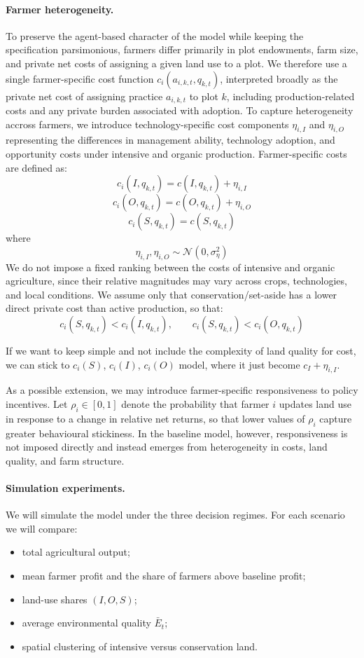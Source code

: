 \documentclass{article}
\begin{document}
\paragraph{Farmer heterogeneity.}
To preserve the agent-based character of the model while keeping the specification parsimonious, farmers differ primarily in plot endowments, farm size, and private net costs of assigning a given land use to a plot. We therefore use a single farmer-specific cost function $c_i(a_{i,k,t},q_{k,t})$, interpreted broadly as the private net cost of assigning practice $a_{i,k,t}$ to plot $k$, including production-related costs and any private burden associated with adoption. To capture heterogeneity accross farmers, we introduce technology-specific cost components $\eta_{i, I}$ and $\eta_{i,O}$ representing the differences in management ability, technology adoption, and opportunity costs under intensive and organic production. Farmer-specific costs are defined as:
\[
c_i(I,q_{k,t}) = c(I,q_{k,t}) + \eta_{i,I}
\]
\[
c_i(O,q_{k,t}) = c(O,q_{k,t}) + \eta_{i,O}
\]
\[
c_i(S,q_{k,t}) = c(S,q_{k,t})
\]
where
\[
\eta_{i,I}, \eta_{i,O} \sim \mathcal {N}(0,\sigma_\eta^2)
\]
We do not impose a fixed ranking between the costs of intensive and organic agriculture, since their relative magnitudes may vary across crops, technologies, and local conditions. We assume only that conservation/set-aside has a lower direct private cost than active production, so that:
\[c_i(S,q_{k,t}) < c_i(I,q_{k,t}), \qquad c_i(S,q_{k,t}) < c_i(O,q_{k,t})\]

{If we want to keep simple and not include the complexity of land quality for cost, we can stick to $c_i(S)$, $c_i(I)$, $c_i(O)$ model, where it just become $c_I + \eta_{i,I}$.}

As a possible extension, we may introduce farmer-specific responsiveness to policy incentives. Let $\rho_i \in [0,1]$ denote the probability that farmer $i$ updates land use in response to a change in relative net returns, so that lower values of $\rho_i$ capture greater behavioural stickiness. In the baseline model, however, responsiveness is not imposed directly and instead emerges from heterogeneity in costs, land quality, and farm structure.


\paragraph{Simulation experiments.}
We will simulate the model under the three decision regimes.
For each scenario we will compare:
\begin{itemize}
    \item total agricultural output;
    \item mean farmer profit and the share of farmers above baseline profit;
    \item land-use shares $(I,O,S)$;
    \item average environmental quality $\bar E_t$;
    \item spatial clustering of intensive versus conservation land.
\end{itemize}
\end{document}
